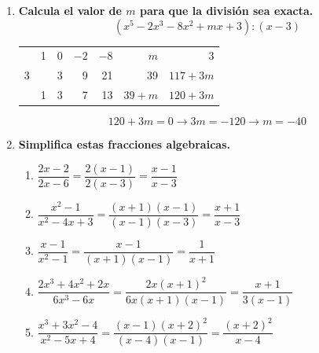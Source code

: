\documentclass[a4paper,12pt]{article}
\begin{document}
\begin{enumerate}
    \vspace{0.5cm}

    \item \textbf{Calcula el valor de $m$ para que la división sea exacta.}
    \[
    (x^5 - 2x^3 - 8x^2 + mx + 3) : (x - 3)
    \]
    \begin{center}
    \begin{tabular}{r|rrrrrr}
      & 1 & 0 & $-2$ & $-8$ & $m$ & 3 \\
    3 &   & 3 & 9 & 21 & 39 & $117 + 3m$ \\ \hline
      & 1 & 3 & 7 & 13 & $39 + m$ & \multicolumn{1}{|r}{$120 + 3m$}
    \end{tabular}
    \end{center}

    \[
    120 + 3m = 0 \longrightarrow 3m = -120 \longrightarrow m = -40
    \]

    \vspace{0.5cm}

    \item \textbf{Simplifica estas fracciones algebraicas.}
        \begin{enumerate}[label=\textbf{\alph*)}]
            \item $\dfrac{2x - 2}{2x - 6} = \dfrac{2(x - 1)}{2(x - 3)} = \dfrac{x - 1}{x - 3}$
            
            \vspace{0.3cm}
            
            \item $\dfrac{x^2 - 1}{x^2 - 4x + 3} = \dfrac{(x + 1)(x - 1)}{(x - 1)(x - 3)} = \dfrac{x + 1}{x - 3}$
            
            \vspace{0.3cm}
            
            \item $\dfrac{x - 1}{x^2 - 1} = \dfrac{x - 1}{(x + 1)(x - 1)} = \dfrac{1}{x + 1}$
            
            \vspace{0.3cm}
            
            \item $\dfrac{2x^3 + 4x^2 + 2x}{6x^3 - 6x} = \dfrac{2x(x + 1)^2}{6x(x + 1)(x - 1)} = \dfrac{x + 1}{3(x - 1)}$
            
            \vspace{0.3cm}
            
            \item $\dfrac{x^3 + 3x^2 - 4}{x^2 - 5x + 4} = \dfrac{(x - 1)(x + 2)^2}{(x - 4)(x - 1)} = \dfrac{(x + 2)^2}{x - 4}$
            

\end{enumerate}
\end{enumerate}
\end{document}
